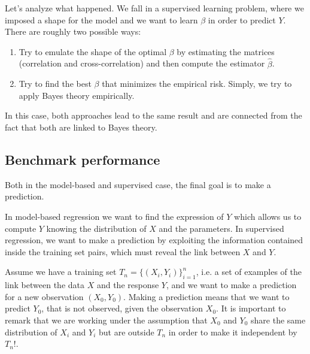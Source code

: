 

Let's analyze what happened. We fall in a supervised learning problem, where we imposed a shape for the model and we want to learn $\beta$ in order to predict $Y$. There are roughly two possible ways:
\begin{enumerate}
    \item Try to emulate the shape of the optimal $\beta$ by estimating the matrices (correlation and cross-correlation) and then compute the estimator $\hat{\beta}$.
    \item Try to find the best $\beta$ that minimizes the empirical risk. Simply, we try to apply Bayes theory empirically.
\end{enumerate}
In this case, both approaches lead to the same result and are connected from the fact that both are linked to Bayes theory.

\subsection{Benchmark performance}

Both in the model-based and supervised case, the final goal is to make a prediction.

In model-based regression we want to find the expression of $Y$ which allows us to compute $Y$ knowing the distribution of $X$ and the parameters. In supervised regression, we want to make a prediction by exploiting the information contained inside the training set pairs, which must reveal the link between $X$ and $Y$.

Assume we have a training set $T_n = \{(X_i, Y_i)\}_{i=1}^n$, i.e. a set of examples of the link between the data $X$ and the response $Y$, and we want to make a prediction for a new observation $(X_0, Y_0)$. Making a prediction means that we want to predict $Y_0$, that is not observed, given the observation $X_0$. It is important to remark that we are working under the assumption that $X_0$ and $Y_0$ share the same distribution of $X_i$ and $Y_i$ but are outside $T_n$ in order to make it independent by $T_n$!.

